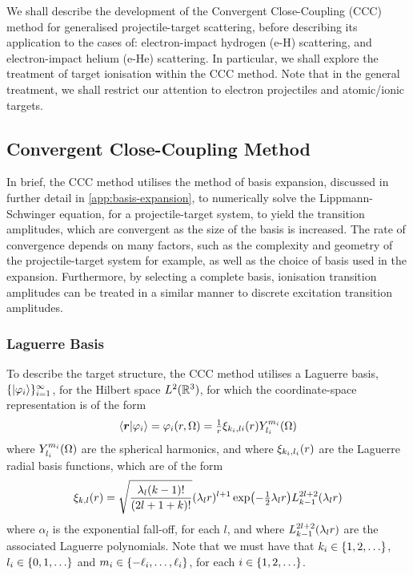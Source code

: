 \documentclass[draft]{article}
\begin{document}

We shall describe the development of the Convergent Close-Coupling (CCC) method
for generalised projectile-target scattering, before describing its application
to the cases of: electron-impact hydrogen (e-H) scattering, and electron-impact
helium (e-He) scattering.
In particular, we shall explore the treatment of target ionisation within the CCC
method.
Note that in the general treatment, we shall restrict our attention to electron
projectiles and atomic/ionic targets.

\subsection{Convergent Close-Coupling Method}
\label{sec:ccc-method}

In brief, the CCC method utilises the method of basis expansion, discussed in
further detail in \autoref{app:basis-expansion}, to numerically solve the
Lippmann-Schwinger equation, for a projectile-target system, to yield the
transition amplitudes, which are convergent as the size of the basis is
increased.
The rate of convergence depends on many factors, such as the complexity and
geometry of the projectile-target system for example, as well as the choice of
basis used in the expansion.
Furthermore, by selecting a complete basis, ionisation transition amplitudes can
be treated in a similar manner to discrete excitation transition amplitudes.

\subsubsection{Laguerre Basis}
\label{sec:laguerre-basis}

To describe the target structure, the CCC method utilises a Laguerre basis,
$\lbrace\ket{\varphi_{i}}\rbrace_{i = 1}^{\infty}$, for the Hilbert space
$L^{2}(\mathbb{R}^{3})$, for which the coordinate-space representation is of the
form
\begin{equation}
  \label{eq:laguerre-basis}
  \bra{\boldsymbol{r}}
  \ket{\varphi_{i}}
  =
  \varphi_{i}(r, \Omega)
  =
  \tfrac{1}{r}
  \xi_{k_{i}, l{i}}(r)
  Y_{l_{i}}^{m_{i}}(\Omega)
\end{equation}
where $Y_{l_{i}}^{m_{i}}(\Omega)$ are the spherical harmonics, and where
$\xi_{k_{i}, l_{i}}(r)$ are the Laguerre radial basis functions, which are of
the form
\begin{equation}
  \label{eq:laguerre-radial-basis}
  \xi_{k, l}\lr{r}
  =
  \sqrt
  {
    \dfrac
    {
      \lambda_{l}
      \lr{k - 1}!
    }
    {
      \lr{2l + 1 + k}!
    }
  }
  \lr{\lambda_{l} r}^{l + 1}
  \exponential\lr[\big]{- \tfrac{1}{2} \lambda_{l} r}
  L_{k - 1}^{2l + 2}\lr{\lambda_{l} r}
\end{equation}
where $\alpha_{l}$ is the exponential fall-off, for each $l$, and where
$L_{k - 1}^{2l + 2}(\lambda_{l} r)$ are the associated Laguerre polynomials.
Note that we must have that
$k_{i} \in \lrset{1, 2, \dotsc}$,
$l_{i} \in \lrset{0, 1, \dotsc}$ and
$m_{i} \in \lbrace-\ell_{i}, \dotsc, \ell_{i}\rbrace$, for each
$i \in \lrset{1, 2, \dotsc}$.
\end{document}
